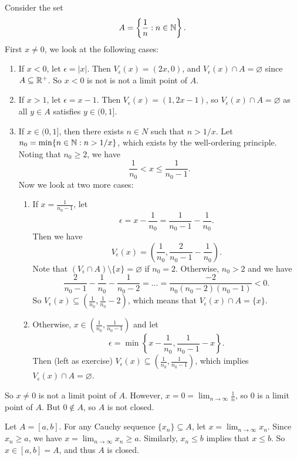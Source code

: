 \begin{example}
  Consider the set
  \[
    A = \left\{\frac{1}{n} : n \in \mathbb{N}\right\}
  .\]
  First $x \ne 0$, we look at the following cases:
  \begin{enumerate}
    \item If $x < 0$, let $\epsilon = |x|$. Then
    $V_\epsilon(x) = (2x, 0)$, and
    $V_\epsilon(x) \cap A = \varnothing$ since
    $A \subseteq \mathbb{R}^+$. So $x < 0$ is not
    is not a limit point of $A$.
  \item If $x > 1$, let $\epsilon = x - 1$. Then
    $V_\epsilon(x) = (1, 2x - 1)$, so
    $V_\epsilon(x) \cap A = \varnothing$ as all $y \in A$
    satisfies $y \in (0, 1]$.
  \item If $x \in (0, 1]$, then there exists $n \in N$
    such that $n > 1 / x$. Let
    $n_0 = \min\{n \in \mathbb{N} : n > 1 / x\}$, which exists
    by the well-ordering principle. Noting that
    $n_0 \ge 2$, we have
    \[
    \frac{1}{n_0} < x \le \frac{1}{n_0 - 1}
    .\]
    Now we look at two more cases:
    \begin{enumerate}
      \item If $x = \frac{1}{n_0 - 1}$, let
        \[\epsilon = x - \frac{1}{n_0} = \frac{1}{n_0 - 1} - \frac{1}{n_0}.\]
        Then we have
        \[
        V_\epsilon(x) = \left(\frac{1}{n_0}, \frac{2}{n_0 - 1} - \frac{1}{n_0}\right)
        .\]
        Note that
        $(V_\epsilon \cap A) \setminus \{x\} = \varnothing$ if $n_0 = 2$.
        Otherwise, $n_0 > 2$ and we have
        \[\frac{2}{n_0 - 1} - \frac{1}{n_0} - \frac{1}{n_0 - 2} = \dots = \frac{-2}{n_0(n_0 - 2)(n_0 - 1)} < 0.\]
        So $V_\epsilon(x) \subseteq \left(\frac{1}{n_0}, \frac{1}{n_0} - 2\right)$, which means that
        $V_\epsilon(x) \cap A = \{x\}$.
      \item Otherwise, $x \in \left(\frac{1}{n_0}, \frac{1}{n_0 - 1}\right)$
        and let
        \[\epsilon = \min\left\{x - \frac{1}{n_0}, \frac{1}{n_0 - 1} - x\right\}.\]
        Then (left as exercise)
        $V_\epsilon(x) \subseteq \left(\frac{1}{n_0}, \frac{1}{n_0 - 1}\right)$,
        which implies $V_\epsilon(x) \cap A = \varnothing$.
    \end{enumerate}
  \end{enumerate}
  So $x \ne 0$ is not a limit point of $A$. However,
  $x = 0 = \lim_{n \to \infty} \frac{1}{n}$, so $0$ is
  a limit point of $A$. But $0 \notin A$, so $A$ is
  not closed.
\end{example}

\begin{example}
  Let $A = [a, b]$. For any Cauchy sequence
  $\{x_n\} \subseteq A$, let
  $x = \lim_{n \to \infty} x_n$. Since
  $x_n \ge a$, we have $x = \lim_{n \to \infty} x_n \ge a$.
  Similarly, $x_n \le b$ implies that $x \le b$. So
  $x \in [a, b] = A$, and thus $A$ is closed.
\end{example}

